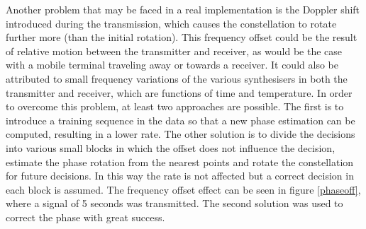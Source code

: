 \documentclass[12pt,a4paper,openright]{article}
\begin{document}
Another problem that may be faced in a real implementation is the Doppler shift introduced during the transmission, which causes the constellation to rotate further more (than the initial rotation). This frequency offset could be the result of relative motion between the transmitter and receiver, as would be the case with a mobile terminal traveling away or towards a receiver. It could also be attributed to small frequency variations of the various synthesisers in both the transmitter and receiver, which are functions of time and temperature. In order to overcome this problem, at least two approaches are possible. The first is to introduce a training sequence in the data so that a new phase estimation can be computed, resulting in a lower rate. The other solution is to divide the decisions into various small blocks in which the offset does not influence the decision, estimate the phase rotation from the nearest points and rotate the constellation for future decisions. In this way the rate is not affected but a correct decision in each block is assumed. The frequency offset effect can be seen in figure \ref{phaseoff}, where a signal of 5 seconds was transmitted. The second solution was used to correct the phase with great success.
\end{document}
